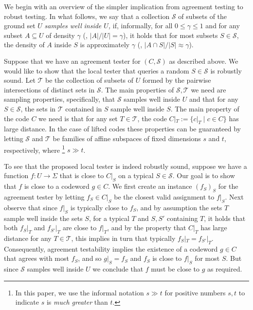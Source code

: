\documentclass{toc}
\theoremstyle{plain}
\newcommand{\calT}{{\mathcal{T}}}
\newcommand{\calS}{{\mathcal{S}}}
\begin{document}
We begin with an overview of the simpler implication from agreement
testing to robust testing. In what follows, we say that a
collection %
$\calS$ of subsets %
of the ground set $U$ \emph{samples well}
%
%
%
%
%
%
\emph{inside $U$,}   %
if, informally,
for all $0\le \gamma\le 1$ and %
%
%
for any subset $A \subseteq U$ of density $\gamma$ (\ie, $|A|/|U| = \gamma$),
it holds that for most subsets $S \in \calS$, the density of $A$ inside $S$
is approximately $\gamma$
%
(\ie, $|A\cap S| /|S| \approx \gamma$). %
%

Suppose that we have an agreement tester for  %
$(C, \calS)$   %
as described above. We would like to show that the local tester that 
queries a random $S \in \calS$ is robustly sound.
Let $\calT$ be the collection of subsets of $U$ formed by
the %
%
pairwise intersections of
distinct  %
%
sets in $\calS$.
%
%
%
The main properties
%
of $\calS, \calT$ we need    %
are sampling properties, 
specifically, that $\calS$ samples well
%
inside $U$   %
and that for any $S \in \calS$, %
the sets  %
in $\calT$ contained in $S$ sample well 
%
inside $S$.   %
 The main property %
of the code $C$
we need  %
is that for any set $T \in \calT$, the code $C|_T:=\{c|_T \mid c\in C\}$
has large distance.  %
In the case of lifted codes these properties can be guaranteed by letting 
%
$\calS$ and $\calT$  %
be families of affine subspaces of fixed dimensions
%
$s$ and $t$,  %
respectively, where%
%
%
%
%
\footnote{In this paper, we use the informal notation $s \gg t$
for positive numbers $s,t$ to indicate $s$ is \emph{much greater}
than $t$.}   %
$s \gg t$.

To see that the proposed local tester is indeed robustly sound, suppose
we have a function $f: U \to \Sigma$ that is close to  $C|_S$ on a
%
typical $S\in\calS$.  %
Our goal is to show that $f$ is close to a codeword $g \in C$. We first create an instance $(f_S)_S$ for the agreement tester by letting $f_S \in C|_S$ be the closest valid assignment to $f|_S$. Next observe that since $f|_S$ is typically close to $f_S$, and by assumption 
%
the sets $T$ sample well inside the sets $S$,  %
for a typical $T$ and $S,S'$ containing $T$, it holds that both $f_S|_T$ 
and  $f_{S'}|_T$ are close to $f|_T$, and by the
%
property that $C|_T$ has large distance  %
%
%
for any $T \in \calT$,
this implies in turn that typically $f_S|_T = f_{S'}|_T$.
Consequently, agreement testability implies the existence of a codeword $g \in C$ that agrees with most $f_S$, and so $g|_S= f_S$ and $f_S$ is close to  $f|_S$ for most $S$. But since $\calS$ samples well inside $U$ we conclude that $f$ must be close to $g$ as required.
\end{document}
